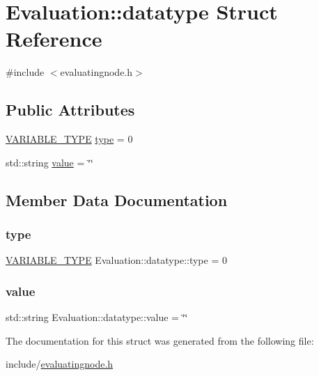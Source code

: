 \hypertarget{structEvaluation_1_1datatype}{}\section{Evaluation\+:\+:datatype Struct Reference}
\label{structEvaluation_1_1datatype}


{\ttfamily \#include $<$evaluatingnode.\+h$>$}

\subsection*{Public Attributes}
\begin{DoxyCompactItemize}
\item 
\hyperlink{statics_8h_a4c85b3a98d55cc0252806c950379cce0}{V\+A\+R\+I\+A\+B\+L\+E\+\_\+\+T\+Y\+PE} \hyperlink{structEvaluation_1_1datatype_a608b8aad78f560f52549422c4a1921e2}{type} = 0
\item 
std\+::string \hyperlink{structEvaluation_1_1datatype_acb206aace88caf1dde6fea1211ce9714}{value} = \char`\"{}\char`\"{}
\end{DoxyCompactItemize}


\subsection{Member Data Documentation}
\mbox{\label{structEvaluation_1_1datatype_a608b8aad78f560f52549422c4a1921e2}} 
\subsubsection{\texorpdfstring{type}{type}}
{\footnotesize\ttfamily \hyperlink{statics_8h_a4c85b3a98d55cc0252806c950379cce0}{V\+A\+R\+I\+A\+B\+L\+E\+\_\+\+T\+Y\+PE} Evaluation\+::datatype\+::type = 0}

\mbox{\label{structEvaluation_1_1datatype_acb206aace88caf1dde6fea1211ce9714}} 
\subsubsection{\texorpdfstring{value}{value}}
{\footnotesize\ttfamily std\+::string Evaluation\+::datatype\+::value = \char`\"{}\char`\"{}}



The documentation for this struct was generated from the following file\+:\begin{DoxyCompactItemize}
\item 
include/\hyperlink{evaluatingnode_8h}{evaluatingnode.\+h}\end{DoxyCompactItemize}
